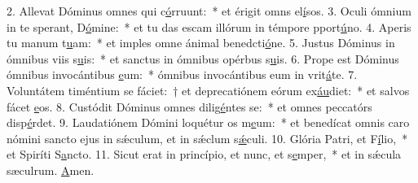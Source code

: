 2. Allevat Dóminus omnes qui c\uline{ó}rruunt:~* et érigit omns el\uline{í}sos.
3. Oculi ómnium in te sperant, D\uline{ó}mine:~* et tu das escam illórum in témpore pport\uline{ú}no.
4. Aperis tu manum t\uline{u}am:~* et imples omne ánimal benedcti\uline{ó}ne.
5. Justus Dóminus in ómnibus viis s\uline{u}is:~* et sanctus in ómnibus opérbus s\uline{u}is.
6. Prope est Dóminus ómnibus invocántibus \uline{e}um:~* ómnibus invocántibus eum in vrit\uline{á}te.
7. Voluntátem timéntium se fáciet:~† et deprecatiónem eórum ex\uline{áu}diet:~* et salvos fácet \uline{e}os.
8. Custódit Dóminus omnes dilig\uline{é}ntes se:~* et omnes peccatórs disp\uline{é}rdet.
9. Laudatiónem Dómini loquétur os m\uline{e}um:~* et benedícat omnis caro nómini sancto ejus in sǽculum, et in sǽclum s\uline{ǽ}culi.
10. Glória Patri, et F\uline{í}lio,~* et Spiríti S\uline{a}ncto.
11. Sicut erat in princípio, et nunc, et s\uline{e}mper,~* et in sǽcula sæculrum. \uline{A}men.
